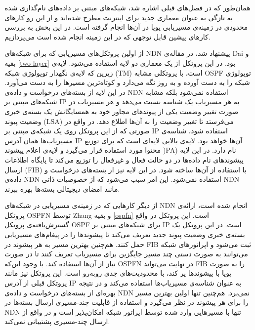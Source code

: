 

همان‌طور که در فصل‌های قبلی اشاره شد، شبکه‌های مبتنی بر داده‌‌های نام‌گذاری شده به تازگی به عنوان معماری جدید برای اینترنت مطرح شده‌اند و از این رو کارهای محدودی در زمینه‌ی مسیریابی پویا در آن‌ها انجام گرفته است. در این بخش به بررسی کارهای پیشین قابل توجهی که در این زمینه انجام شده است می‌پردازیم.

از اولین پروتکل‌های مسیریابی که برای شبکه‌های NDN پیشنهاد شد، در مقاله‌ی Dai و بقیه \ref{two-layer} بود. در این پروتکل از یک معماری دو لایه استفاده می‌شود. لایه‌ی زیرین که لایه‌ی نگهدار توپولوژی شبکه  (TM) است، با پروتکلی مشابه OSPF توپولوژی شبکه را به دست آورده و به روز نگه می‌دارد و کوتاه‌ترین مسیرها را به دست می‌آورد. در این لایه از بسته‌های درخواست و داده‌ی NDN استفاده نمی‌شود بلکه مشابه شبکه‌های مبتنی بر IP به هر مسیریاب یک شناسه نسبت می‌دهد و هر مسیریاب در صورت تغییر وضعیت یکی از پیوند‌‌های مجاور خود به همسایگانش یک بسته‌ی خبری وضعیت پیوند  (LSA) می‌فرستد تا تغییر وضعیت را به آن‌ها اطلاع دهد. در واقع در صورتی که از این پروتکل روی یک شبکه‌ی مبتنی بر IP استفاده شود، شناسه‌ی مسیریاب‌ها همان آدرس IP آن‌ها خواهد بود. لایه‌ی بالایی لایه‌ای است که برای توزیع محتوا مورد استفاده قرار می‌گیرد و لایه‌ی اعلام پیشوند   )PA) نام دارد. در این لایه پیشوند‌های نام داده‌ها در دو حالت فعال و غیرفعال را توزیع می‌کند تا پایگاه اطلاعات ارسال (FIB) با استفاده از آن‌ها ساخته شود. در این لایه نیز از بسته‌های درخواست و داده‌ی NDN استفاده نمی‌شود. این امر سبب می‌شود که از خصوصیات ذاتی NDN مانند امضای دیجیتالی بسته‌ها بهره ببرند.

از دیگر کارهایی که در زمینه‌ی مسیریابی در شبکه‌های NDN انجام شده است، ارائه‌ی پروتکل OSPFN توسط Zhang و بقیه \ref{ospfn} است. این پروتکل در واقع گسترش‌یافته‌ی پروتکل OSPF برای شبکه‌های مبتنی بر IP است. در این پروتکل یک بسته‌ی خبری وضعیت پیوند جدید تعریف می‌کند تا پیشوند‌ها را در پیغام‌های مسیریابی حمل کنند. هم‌چنین بهترین مسیر به هر پیشوند در FIB ثبت می‌شود و اپراتورهای شبکه می‌توانند به صورت دستی چند مسیر جایگزین برای مسیریاب تعریف کنند تا در صورت نیاز از آن‌ها استفاده کند. با وجود این‌که OSPFN در نهایت می‌تواند FIB را به صورت پویا با پیشوندها پر کند، با محدودیت‌های جدی روبه‌رو است. این پروتکل نیز مانند پروتکل قبلی از آدرس IP به عنوان شناسه‌ی مسیریاب‌ها استفاده می‌کند و در نتیجه بهره‌ای از بسته‌های درخواست و داده‌ی NDN نمی‌برد. هم‌چنین تنها اولین بهترین مسیر را برای هر پیشوند در نظر می‌گیرد و استفاده از قابلیت چند-مسیری ارسال بسته‌ها در NDN تنها با مسیرهایی وارد شده توسط اپراتور شبکه امکان‌پذیر است و در واقع از ارسال چند-مسیری پشتیبانی نمی‌کند.

